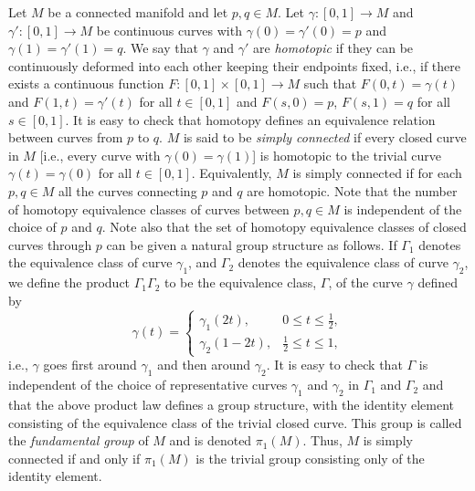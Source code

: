 Let \(M\) be a connected manifold and let \(p,q\in M\). Let
\(\gamma:[0,1]\longrightarrow M\) and \(\gamma':[0,1]\longrightarrow M\) be
continuous curves with \(\gamma(0)=\gamma'(0)=p\) and
\(\gamma(1)=\gamma'(1)=q\). We say that \(\gamma\) and \(\gamma'\) are
\emph{homotopic} if they can be continuously deformed into each other keeping their
endpoints fixed, i.e., if there exists a continuous function
\(F:[0,1]\times[0,1]\longrightarrow M\) such that \(F(0,t)=\gamma(t)\) and
\(F(1,t)=\gamma'(t)\) for all \(t\in[0,1]\) and \(F(s,0)=p\),
\(F(s,1)=q\) for all \(s\in[0,1]\). It is easy to check that homotopy defines an
equivalence relation between curves from \(p\) to \(q\). \(M\) is said to be
\emph{simply connected} if every closed curve in \(M\) [i.e., every curve with
\(\gamma(0)=\gamma(1)\)] is homotopic to the trivial curve
\(\gamma(t)=\gamma(0)\) for all \(t\in[0,1]\). Equivalently, \(M\) is simply
connected if for each \(p,q\in M\) all the curves connecting \(p\) and \(q\) are
homotopic. Note that the number of homotopy equivalence classes of curves between
\(p,q\in M\) is independent of the choice of \(p\) and \(q\). Note also that the set
of homotopy equivalence classes of closed curves through \(p\) can be given a natural
group structure as follows. If \(\Gamma_1\) denotes the equivalence class of curve
\(\gamma_1\), and \(\Gamma_2\) denotes the equivalence class of curve \(\gamma_2\),
we define the product \(\Gamma_1\Gamma_2\) to be the equivalence class, \(\Gamma\),
of the curve \(\gamma\) defined by
\begin{equation}
  \gamma(t)=
  \begin{cases}
    \gamma_1(2t),&0\le t\le\tfrac12,\\
    \gamma_2(1-2t),&\tfrac12\le t\le1,
  \end{cases}
  \tag{13.1.3}\label{eq:13.1.3}
\end{equation}
i.e., \(\gamma\) goes first around \(\gamma_1\) and then around \(\gamma_2\). It is
easy to check that \(\Gamma\) is independent of the choice of representative curves
\(\gamma_1\) and \(\gamma_2\) in \(\Gamma_1\) and \(\Gamma_2\) and that the above
product law defines a group structure, with the identity element consisting of the
equivalence class of the trivial closed curve. This group is called the
\emph{fundamental group} of \(M\) and is denoted \(\pi_1(M)\). Thus, \(M\) is simply
connected if and only if \(\pi_1(M)\) is the trivial group consisting only of the
identity element.

